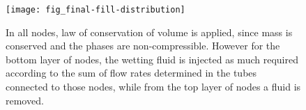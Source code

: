 		\begin{figure}[H]
			\centering
			\texttt{[image: fig\_final-fill-distribution]}
			\caption{In all nodes, law of conservation of volume is applied, since mass is conserved and the phases are non-compressible. However for the bottom layer of nodes, the wetting fluid is injected as much required according to the sum of flow rates determined in the tubes connected to those nodes, while from the top layer of nodes a fluid is removed.}
			\label{fig_plot-sat-vs-time-disp-two}
		\end{figure}
 
	
